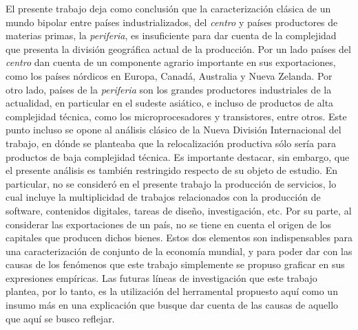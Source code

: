 \documentclass[class=article, crop=false]{standalone}
\begin{document}
El presente trabajo deja como conclusión que la caracterización clásica de un mundo bipolar entre países industrializados, del \textit{centro} y países productores de materias primas, la \textit{periferia}, es insuficiente para dar cuenta de la complejidad que presenta la división geográfica actual de la producción. Por un lado países del \textit{centro} dan cuenta de un componente agrario importante en sus exportaciones, como los países nórdicos en Europa, Canadá, Australia y Nueva Zelanda. Por otro lado, países de la \textit{periferia} son los grandes productores industriales de la actualidad, en particular en el sudeste asiático, e incluso de productos de alta complejidad técnica, como los microprocesadores y transistores, entre otros. Este punto incluso se opone al análisis clásico de la Nueva División Internacional del trabajo, en dónde se planteaba que la relocalización productiva sólo sería para productos de baja complejidad técnica. Es importante destacar, sin embargo, que el presente análisis es también restringido respecto de su objeto de estudio. En particular, no se consideró en el presente trabajo la producción de servicios, lo cual incluye la multiplicidad de trabajos relacionados con la producción de software, contenidos digitales, tareas de diseño, investigación, etc. Por su parte, al considerar las exportaciones de un país, no se tiene en cuenta el origen de los capitales que producen dichos bienes. Estos dos elementos son indispensables para una caracterización de conjunto de la economía mundial, y para poder dar con las causas de los fenómenos que este trabajo simplemente se propuso graficar en sus expresiones empíricas. 
Las futuras líneas de investigación que este trabajo plantea, por lo tanto, es la utilización del herramental propuesto aquí como un insumo más en una explicación que busque dar cuenta de las causas de aquello que aquí se busco reflejar. 
\end{document}
